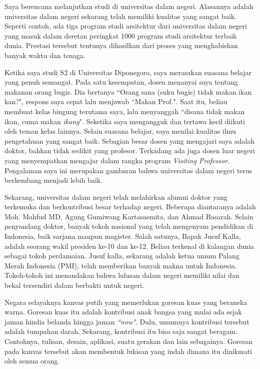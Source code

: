 \documentclass{article}
\begin{document}

Saya berencana melanjutkan studi di universitas dalam negeri. Alasannya adalah universitas dalam negeri sekarang telah memiliki kualitas yang sangat baik. Seperti contoh, ada tiga program studi arsitektur dari universitas dalam negeri yang masuk dalam deretan peringkat 1000 program studi arsitektur terbaik dunia. Prestasi tersebut tentunya dihasilkan dari proses yang menghabiskan banyak waktu dan tenaga.

Ketika saya studi S2 di Universitas Diponegoro, saya merasakan suasana belajar yang penuh semangat. Pada satu kesempatan, dosen menanyai saya tentang makanan orang bugis. Dia bertanya ``Orang sana (suku bugis) tidak makan ikan kan?", respons saya cepat lalu menjawab ``Makan Prof.". Saat itu, beliau membuat kelas bingung terutama saya, lalu menyanggah ``disana tidak makan ikan, cuma makan \textit{ikang}".
Seketika saya mengangguk dan tertawa kecil diikuti oleh teman kelas lainnya. Selain suasana belajar, saya menilai kualitas ilmu pengetahuan yang sangat baik.
Sebagian besar dosen yang mengajari saya adalah doktor, bahkan tidak sedikit yang profesor. Terkadang ada juga dosen luar negeri yang menyempatkan mengajar dalam rangka program \textit{Visiting Professor}. Pengalaman saya ini merupakan gambaran bahwa universitas dalam negeri terus berkembang menjadi lebih baik.

Sekarang, universitas dalam negeri telah melahirkan alumni doktor yang terkemuka dan berkontribusi besar terhadap negeri.
Beberapa diantaranya adalah Moh. Mahfud MD, Agung Gumiwang Kartasasmita, dan Ahmad Basarah. Selain penyandang doktor, banyak tokoh nasional yang telah mengenyam pendidikan di Indonesia, baik sarjana maupun magister. Salah satunya, Bapak Jusuf Kalla, adalah seorang wakil presiden ke-10 dan ke-12. Beliau terkenal di kalangan dunia sebagai tokoh perdamaian. Jusuf kalla, sekarang adalah ketua umum Palang Merah Indonesia (PMI), telah memberikan banyak makna untuk Indonesia.
Tokoh-tokoh ini menandakan bahwa lulusan dalam negeri memiliki nilai dan bekal tersendiri dalam berbakti untuk negeri.

Negara selayaknya kanvas putih yang memerlukan goresan kuas yang beraneka warna. Goresan kuas itu adalah kontribusi anak bangsa yang mulai ada sejak jaman hindia belanda hingga jaman \textit{``now"}. Dulu, umumnya kontribusi tersebut adalah tumpahan darah. Sekarang, kontribusi itu bisa saja sangat beragam. Contohnya, tulisan, desain, aplikasi, suatu gerakan dan lain sebagainya. Goresan pada kanvas tersebut akan membentuk lukisan yang indah dimana itu dinikmati oleh semua orang. %
\end{document}
